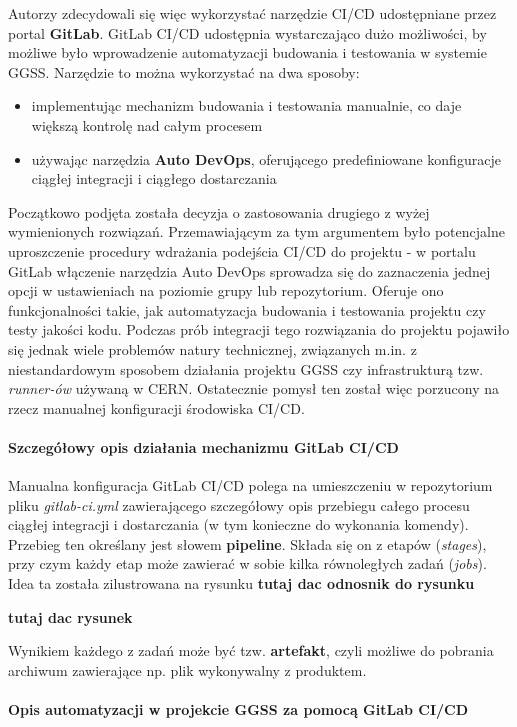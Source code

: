 Autorzy zdecydowali się więc wykorzystać narzędzie CI/CD udostępniane przez portal \textbf{GitLab}. GitLab CI/CD udostępnia wystarczająco dużo możliwości, by możliwe było wprowadzenie automatyzacji budowania i testowania w systemie GGSS. Narzędzie to można wykorzystać na dwa sposoby:
\begin{itemize}
\item implementując mechanizm budowania i testowania manualnie, co daje większą kontrolę nad całym procesem
\item używając narzędzia \textbf{Auto DevOps}, oferującego predefiniowane konfiguracje ciągłej integracji i ciągłego dostarczania
\end{itemize}
Początkowo podjęta została decyzja o zastosowania drugiego z wyżej wymienionych rozwiązań. Przemawiającym za tym argumentem było potencjalne uproszczenie procedury wdrażania podejścia CI/CD do projektu - w portalu GitLab włączenie narzędzia Auto DevOps sprowadza się do zaznaczenia jednej opcji w ustawieniach na poziomie grupy lub repozytorium. Oferuje ono funkcjonalności takie, jak automatyzacja budowania i testowania projektu czy testy jakości kodu. Podczas prób integracji tego rozwiązania do projektu pojawiło się jednak wiele problemów natury technicznej, związanych m.in. z niestandardowym sposobem działania projektu GGSS czy infrastrukturą tzw. \textit{runner-ów} używaną w CERN. Ostatecznie pomysł ten został więc porzucony na rzecz manualnej konfiguracji środowiska CI/CD. 

\paragraph*{Szczegółowy opis działania mechanizmu GitLab CI/CD}
Manualna konfiguracja GitLab CI/CD polega na umieszczeniu w repozytorium pliku \textit{gitlab-ci.yml} zawierającego szczegółowy opis przebiegu całego procesu ciągłej integracji i dostarczania (w tym konieczne do wykonania komendy). Przebieg ten określany jest słowem \textbf{pipeline}. Składa się on z etapów (\textit{stages}), przy czym każdy etap może zawierać w sobie kilka równoległych zadań (\textit{jobs}). Idea ta została zilustrowana na rysunku \textbf{tutaj dac odnosnik do rysunku}

\textbf{tutaj dac rysunek}

Wynikiem każdego z zadań może być tzw. \textbf{artefakt}, czyli możliwe do pobrania archiwum zawierające np. plik wykonywalny z produktem. 


\paragraph*{Opis automatyzacji w projekcie GGSS za pomocą GitLab CI/CD}

